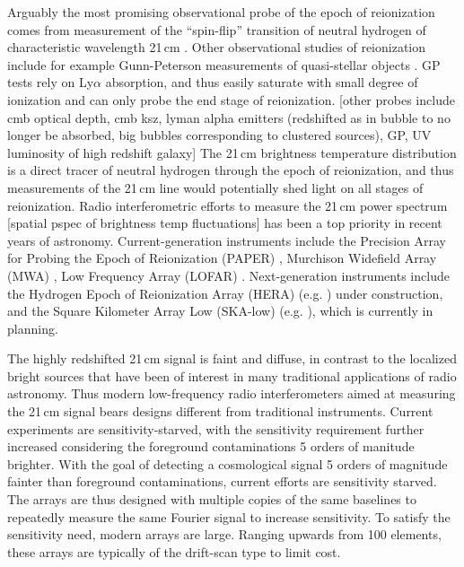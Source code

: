 \documentclass[twocolumn,apj,numberedappendix]{emulateapj}
\renewcommand\[{\begin{equation}}
\renewcommand\]{\end{equation}}
\begin{document}
Arguably the most promising observational probe of the epoch of reionization
comes from measurement of the ``spin-flip'' transition of neutral
hydrogen of characteristic wavelength 21\,cm \citep{Furlanetto2006181,PritchardLoeb}.
Other observational studies of reionization include for example Gunn-Peterson measurements of quasi-stellar objects \citep{Fan2006}. GP tests rely on Ly$\alpha$ absorption, and thus easily saturate with small degree of ionization and can only probe the end stage of reionization. [other probes include cmb optical depth, cmb ksz, lyman alpha emitters (redshifted as in bubble to no longer be absorbed, big bubbles corresponding to clustered sources), GP, UV luminosity of high redshift galaxy] The 21\,cm brightness temperature distribution is a direct tracer of neutral hydrogen through the epoch of reionization, and thus measurements of the 21\,cm line would potentially
shed light on all stages of reionization. Radio interferometric efforts
to measure the 21\,cm power spectrum [spatial pspec of brightness temp fluctuations] has been a top priority in recent years of astronomy.
Current-generation instruments include the Precision Array for Probing
the Epoch of Reionization (PAPER) \citep{Ali2015,paper32}, Murchison
Widefield Array (MWA) \citep{Bowman2013, Tingay2013}, Low Frequency Array (LOFAR) \citep{LOFAR}. Next-generation instruments include the Hydrogen Epoch of Reionization
Array (HERA) (e.g. \citealt{HERA,HERAconfiguration,HERABEAM1,HERADISH2})  under construction, 
and the Square Kilometer Array Low (SKA-low) (e.g. \citealt{SKA1}), which is currently in planning. 

The highly redshifted 21\,cm signal is faint and diffuse, in contrast to the localized bright sources that have been of interest in many traditional applications of radio astronomy. Thus modern low-frequency radio interferometers aimed at measuring the 21\,cm signal bears designs different from traditional instruments.  Current experiments are sensitivity-starved, with the sensitivity requirement further increased considering the foreground contaminations 5 orders of manitude brighter. With the goal of detecting a cosmological signal 5 orders of magnitude fainter than foreground contaminations, current efforts are sensitivity starved. The arrays are thus designed with multiple copies of the same baselines to repeatedly measure the same Fourier signal to increase sensitivity. To satisfy the sensitivity need, modern arrays are large. Ranging upwards from 100 elements, these arrays are typically of the drift-scan type to limit cost.
\end{document}
